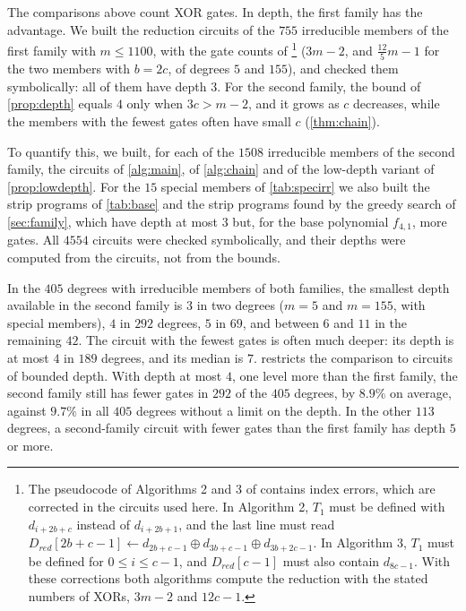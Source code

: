 \documentclass{ieeeaccess}
\theoremstyle{plain}
\theoremstyle{definition}
\begin{document}
The comparisons above count XOR gates. In depth, the first family has the
advantage. We built the reduction circuits of the $755$ irreducible members of
the first family with $m\le1100$, with the gate counts of \cite{BCP2019}\footnote{The pseudocode of Algorithms 2 and 3 of \cite{BCP2019} contains index errors, which are corrected in the circuits used here. In Algorithm 2, $T_1$ must be defined with $d_{i+2b+c}$ instead of $d_{i+2b+1}$, and the last line must read $D_{red}[2b+c-1]\leftarrow d_{2b+c-1}\oplus d_{3b+c-1}\oplus d_{3b+2c-1}$. In Algorithm 3, $T_1$ must be defined for $0\le i\le c-1$, and $D_{red}[c-1]$ must also contain $d_{8c-1}$. With these corrections both algorithms compute the reduction with the stated numbers of XORs, $3m-2$ and $12c-1$.}
($3m-2$, and $\tfrac{12}{5}m-1$ for the two members with $b=2c$, of degrees $5$
and $155$), and checked them symbolically: all of them have depth $3$. For the
second family, the bound of \cref{prop:depth} equals $4$ only when $3c>m-2$,
and it grows as $c$ decreases, while the members with the fewest gates often
have small $c$ (\cref{thm:chain}).

To quantify this, we built, for each of the $1508$ irreducible members of the
second family, the circuits of \cref{alg:main}, of \cref{alg:chain} and of the
low-depth variant of \cref{prop:lowdepth}. For the $15$ special members of
\cref{tab:specirr} we also built the strip programs of \cref{tab:base} and the
strip programs found by the greedy search of \cref{sec:family}, which have
depth at most $3$ but, for the base polynomial $f_{4,1}$, more gates. All
$4554$ circuits were checked symbolically, and their depths were computed
from the circuits, not from the bounds.

In the $405$ degrees with irreducible members of both families, the smallest
depth available in the second family is $3$ in two degrees ($m=5$ and
$m=155$, with special members), $4$ in $292$ degrees, $5$ in $69$, and between
$6$ and $11$ in the remaining $42$. The circuit with the fewest gates is often
much deeper: its depth is at most $4$ in $189$ degrees, and its median is $7$.
 restricts the comparison to circuits of bounded depth. With
depth at most $4$, one level more than the first family, the second family
still has fewer gates in $292$ of the $405$ degrees, by $8.9\%$ on average,
against $9.7\%$ in all $405$ degrees without a limit on the depth. In the
other $113$ degrees, a second-family circuit with fewer gates than the first
family has depth $5$ or more.
\end{document}
